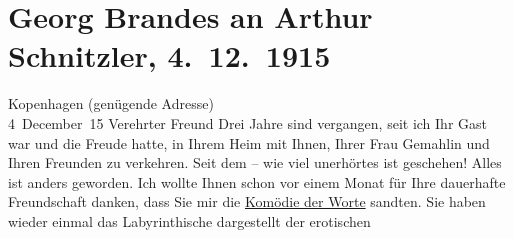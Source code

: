 

         
         \renewcommand{\erwaehntePersonen}{Personen: Georg Brandes, Johann Wolfgang von Goethe, Peter Nansen, Olga Schnitzler}
         \renewcommand{\erwaehnteOrte}{Orte: Dänemark, Kopenhagen, Wien}
         \renewcommand{\erwaehnteWerke}{Werke: Die Brüder Menthe, Komödie der Worte. Drei Einakter, Macbeth, Professor Bernhardi. Komödie in fünf Akten, Wolfgang Goethe}
               \section[Georg Brandes an Arthur Schnitzler, 4. 12. 1915]{ Georg Brandes an Arthur Schnitzler, 4. 12. 1915}\nopagebreak{}\rehead{ }\begin{ledgroupsized}[t]{13cm}\normalsize\beginnumbering \toendnotes[C]{\smallbreak\pagebreak[2]} 
\toendnotes[C]{\smallbreak}\pstart
           \raggedleft{}{\pb}Kopenhagen (genügende Adresse){\\}4 December 15\pend
           \pstart{}Verehrter Freund\pend\pstart
           Drei Jahre sind vergangen, seit ich Ihr Gast war und die Freude hatte, in Ihrem Heim
               mit Ihnen, Ihrer Frau Gemahlin und Ihren Freunden zu verkehren. Seit dem – wie viel unerhörtes ist
               geschehen! Alles ist anders geworden.\pend
           \pstart
           Ich wollte Ihnen schon vor einem Monat für Ihre dauerhafte Freundschaft danken, dass
               Sie mir die \uline{Komödie der Worte} sandten. Sie haben wieder einmal das Labyrinthische dargestellt der erotischen

\end{ledgroupsized}
